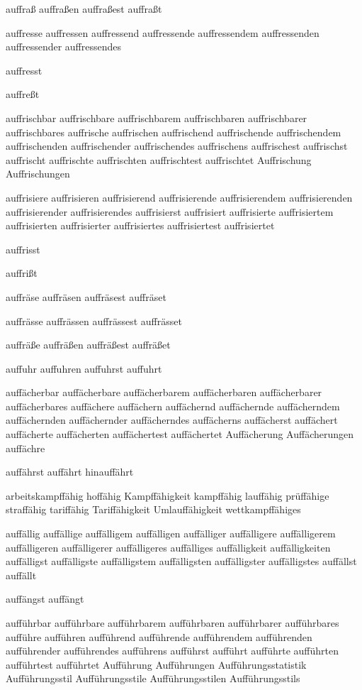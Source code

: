 auffraß auffraßen auffraßest auffraßt

auffresse auffressen auffressend auffressende auffressendem auffressenden auffressender auffressendes

auffresst

auffreßt

auffrischbar auffrischbare auffrischbarem auffrischbaren auffrischbarer auffrischbares auffrische auffrischen auffrischend auffrischende auffrischendem auffrischenden auffrischender auffrischendes auffrischens auffrischest auffrischst auffrischt auffrischte auffrischten auffrischtest auffrischtet Auffrischung Auffrischungen

auffrisiere auffrisieren auffrisierend auffrisierende auffrisierendem auffrisierenden auffrisierender auffrisierendes auffrisierst auffrisiert auffrisierte auffrisiertem auffrisierten auffrisierter auffrisiertes auffrisiertest auffrisiertet

auffrisst

auffrißt

auffräse auffräsen auffräsest auffräset

auffrässe auffrässen auffrässest auffrässet

auffräße auffräßen auffräßest auffräßet

auffuhr auffuhren auffuhrst auffuhrt

auffächerbar auffächerbare auffächerbarem auffächerbaren auffächerbarer auffächerbares auffächere auffächern auffächernd auffächernde auffächerndem auffächernden auffächernder auffächerndes auffächerns auffächerst auffächert auffächerte auffächerten auffächertest auffächertet Auffächerung Auffächerungen auffächre

auffährst auffährt hinauffährt

arbeitskampffähig hoffähig Kampffähigkeit kampffähig lauffähig  prüffähige straffähig tariffähig Tariffähigkeit Umlauffähigkeit wettkampffähiges

auffällig auffällige auffälligem auffälligen auffälliger auffälligere auffälligerem auffälligeren auffälligerer auffälligeres auffälliges auffälligkeit auffälligkeiten auffälligst auffälligste auffälligstem auffälligsten auffälligster auffälligstes auffällst auffällt

auffängst auffängt

aufführbar aufführbare aufführbarem aufführbaren aufführbarer aufführbares aufführe aufführen aufführend aufführende aufführendem aufführenden aufführender aufführendes aufführens aufführst aufführt aufführte aufführten aufführtest aufführtet Aufführung Aufführungen Aufführungsstatistik Aufführungsstil Aufführungsstile Aufführungsstilen Aufführungsstils

